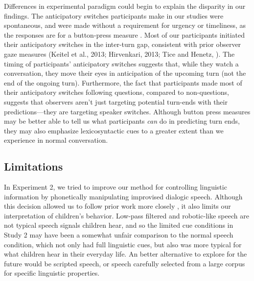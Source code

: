 \documentclass[authoryear, 12pt]{elsarticle}
\begin{document}
Differences in experimental paradigm could begin to explain the disparity in our findings. The anticipatory switches participants make in our studies were spontaneous, and were made without a requirement for urgency or timeliness, as the responses are for a button-press measure \citep{de-ruiter2006, magyari2012}. Most of our participants initiated their anticipatory switches in the inter-turn gap, consistent with prior observer gaze measures (Keitel et al., 2013; Hirvenkari, 2013; Tice and Henetz, \citeyear{TiceHenetz11}). The timing of participants' anticipatory switches suggests that, while they watch a conversation, they move their eyes in anticipation of the upcoming turn (not the end of the ongoing turn). Furthermore, the fact that participants made most of their anticipatory switches following questions, compared to non-questions, suggests that observers aren't just targeting potential turn-ends with their predictions---they are targeting speaker switches. Although button press measures may be better able to tell us what participants \textit{can} do in predicting turn ends, they may also emphasize lexicosyntactic cues to a greater extent than we experience in normal conversation. 


\subsection{Limitations}

In Experiment 2, we tried to improve our method for controlling linguistic information by phonetically manipulating improvised dialogic speech. Although this decision allowed us to follow prior work more closely \cite{de-ruiter2006, keitel2013}, it also limits our interpretation of children's behavior. Low-pass filtered and robotic-like speech are not typical speech signals children hear, and so the limited cue conditions in Study 2 may have been a somewhat unfair comparison to the normal speech condition, which not only had full linguistic cues, but also was more typical for what children hear in their everyday life. An better alternative to explore for the future would be scripted speech, or speech carefully selected from a large corpus for specific linguistic properties. 
\end{document}
